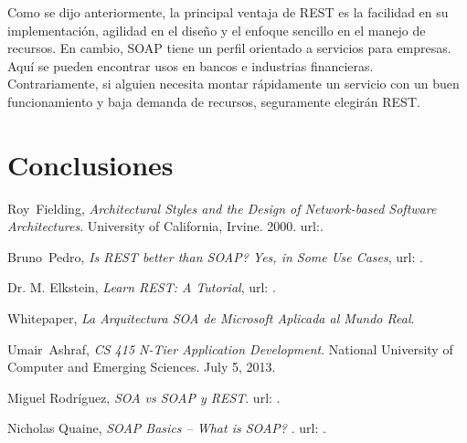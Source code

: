 \documentclass[conference]{IEEEtran}
\begin{document}
Como se dijo anteriormente, la principal ventaja de REST es la
facilidad en su implementación, agilidad en el diseño y el enfoque
sencillo en el manejo de recursos. En cambio, SOAP tiene un perfil
orientado a servicios para empresas. Aquí se pueden encontrar usos en
bancos e industrias financieras. Contrariamente, si alguien necesita
montar rápidamente un servicio con un buen funcionamiento y baja
demanda de recursos, seguramente elegirán REST.

\section{Conclusiones}
\label{sec:con}
\lipsum[1]
\begin{thebibliography}{1}


  Roy~Fielding, \emph{Architectural Styles and the Design of
    Network-based Software Architectures}. University of California,
  Irvine. 2000. url:\texttt{}.

Bruno~Pedro, \emph{Is REST better than SOAP? Yes, in Some Use Cases},
url:
\texttt{}.

  Dr. M. Elkstein, \emph{Learn REST: A Tutorial},
url: \texttt{}.

  Whitepaper, \emph{La Arquitectura SOA de Microsoft Aplicada al Mundo
  Real}.

  Umair~Ashraf, \emph{CS 415 N-Tier Application Development}. National
  University of Computer and Emerging Sciences. July 5, 2013.

  Miguel Rodríguez, \emph{SOA vs SOAP y REST}. url:
  \texttt{}.

  Nicholas Quaine, \emph{ SOAP Basics -- What is SOAP? }. url:
  \texttt{}.

\end{thebibliography}

\end{document}

